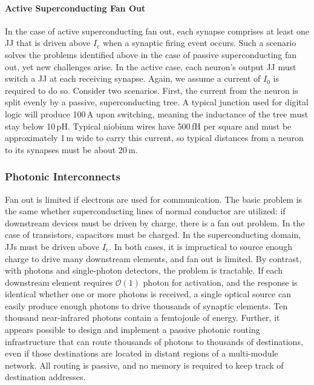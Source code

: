 \paragraph{Active Superconducting Fan Out}
In the case of active superconducting fan out, each synapse comprises at least one JJ that is driven above $I_{\mathrm{c}}$ when a synaptic firing event occurs. Such a scenario solves the problems identified above in the case of passive superconducting fan out, yet new challenges arise. In the active case, each neuron's output JJ must switch a JJ at each receiving synapse. Again, we assume a current of $I_0$ is required to do so. Consider two scenarios. First, the current from the neuron is split evenly by a passive, superconducting tree. A typical junction used for digital logic will produce 100\,\textmu A upon switching, meaning the inductance of the tree must stay below 10\,pH. Typical niobium wires have 500\,fH per square and must be approximately 1\,\textmu m wide to carry this current, so typical distances from a neuron to its synapses must be about 20\,\textmu m.

\subsubsection{Photonic Interconnects}
Fan out is limited if electrons are used for communication. The basic problem is the same whether superconducting lines of normal conductor are utilized: if downstream devices must be driven by charge, there is a fan out problem. In the case of transistors, capacitors must be charged. In the superconducting domain, JJs must be driven above $I_{\mathrm{c}}$. In both cases, it is impractical to source enough charge to drive many downstream elements, and fan out is limited. By contrast, with photons and single-photon detectors, the problem is tractable. If each downstream element requires $\mathcal{O}(1)$ photon for activation, and the response is identical whether one or more photons is received, a single optical source can easily produce enough photons to drive thousands of synaptic elements. Ten thousand near-infrared photons contain a femtojoule of energy. Further, it appears possible to design and implement a passive photonic routing infrastructure that can route thousands of photons to thousands of destinations, even if those destinations are located in distant regions of a multi-module network. All routing is passive, and no memory is required to keep track of destination addresses.


